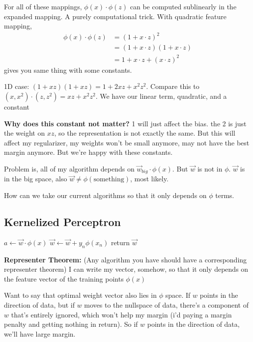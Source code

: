 For all of these mappings, $\phi(x)\cdot \phi(z)$ can be computed
sublinearly in the expanded mapping. A purely computational trick.
With quadratic feature mapping, 
\begin{align*}
\phi(x)\cdot \phi(z) &= (1+x\cdot z)^2  \\
&=(1+x\cdot z)(1+x\cdot z)\\
&=1+x\cdot z + (x \cdot z)^2
\end{align*}
gives you same thing with some constants.

1D case: $(1+xz)(1+xz) = 1+2xz+x^2z^2$.
Compare this to $(x,x^2)\cdot(z,z^2) = xz + x^2z^2$.
We have our linear term, quadratic, and a constant

\textbf{Why does this constant not matter?}
1 will just affect the bias. the 2 is just the weight on $xz$, so the
representation is not exactly the same. But this will affect my
regularizer, my weights won't be small anymore, may not have the best
margin anymore. But we're happy with
these constants.

Problem is, all of my algorithm depends on $\vec w_{big}\cdot \phi(x)$. But
$\vec w$ is not in $\phi$. $\vec w$ is in the big space, also $\vec w
\neq \phi(\text{something})$, most likely.

How can we take our current algorithms so that it only depends on
$\phi$ terms.

\subsection{Kernelized Perceptron}
\label{sec:kernelpercep}
\begin{algorithmic}
   \STATE $a \gets \vec w \cdot \phi(x)$
            \STATE $\vec w \gets \vec w + y_n\phi(x_n)$
   \ENDIF
\ENDFOR
\STATE return $\vec w$
\end{algorithmic}

\textbf{Representer Theorem:} (Any algorithm you have should have a
corresponding representer theorem) I can write my vector, somehow, so
that it only depends on the feature vector of the training points
$\phi(x)$

Want to say that optimal weight vector also lies in $\phi$ space.
If $w$ points in the direction of data, but if $w$ moves to the
nullspace of data, there's a component of $w$ that's entirely ignored,
which won't help my margin (i'd paying a margin penalty and getting
nothing in return). So if $w$ points in the direction of data, we'll
have large margin.

